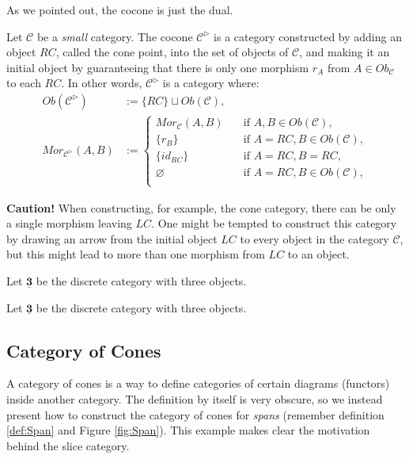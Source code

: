 As we pointed out, the cocone is just the dual.

\begin{definition}
	Let $\mathcal C$ be a \textit{small} category. The cocone $\mathcal C^{\rhd}$ is a category constructed
	by adding an object $RC$, called the cone point, into the set of objects of $\mathcal C$,
	and making it an initial object by guaranteeing that there is only one morphism $r_A$ from $A \in Ob_\mathcal C$ to each
	$RC$. In other words, $\mathcal C^{\rhd}$ is a category where:
	\begin{align*}
		Ob(\mathcal C^{\rhd})        & := \{RC\} \sqcup Ob(\mathcal C), \\
		Mor_{\mathcal C^{\rhd}}(A,B) & :=
		\begin{cases}
			Mor_\mathcal C (A,B)  \quad & \text{if } A,B \in Ob(\mathcal C),       \\
			\{r_B\} \quad               & \text{if } A = RC, B \in Ob(\mathcal C), \\
			\{id_{RC}\}  \quad          & \text{if } A = RC, B = RC,               \\
			\varnothing  \quad          & \text{if } A = RC, B \in Ob(\mathcal C), \\
		\end{cases}
	\end{align*}
\end{definition}

\textbf{Caution!} When constructing, for example, the cone category, there can
be only a single morphism leaving $LC$. One might be tempted to construct this
category by drawing an arrow from the initial object $LC$ to every object
in the category $\mathcal C$, but this might lead to more than one morphism
from $LC$ to an object.

\begin{example}
	Let $\mathbf{\underline{3}}$ be the discrete category with three objects.
\end{example}

\begin{example}
	Let $\mathbf{\underline{3}}$ be the discrete category with three objects.
\end{example}


\subsection{Category of Cones}

A category of cones is a way to define categories of certain diagrams (functors) inside another category.
The definition by itself is very obscure, so we instead present how to construct the category of
cones for \textit{spans} (remember definition \ref{def:Span} and Figure \ref{fig:Span}).
This example makes clear the motivation behind the slice category.

